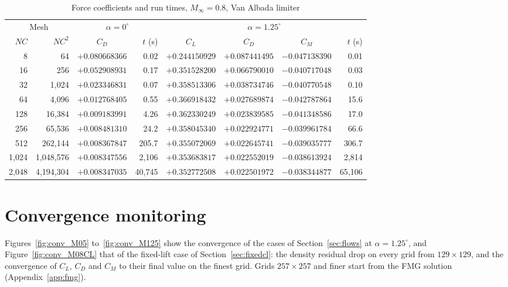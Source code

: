 \documentclass[12pt,a4paper]{article}
\begin{document}
\begin{table}[H]
\centering
\caption{Force coefficients and run times, $M_\infty=0.8$, Van Albada limiter}
\label{tab:forces_M08VA}
\footnotesize
\setlength{\tabcolsep}{4pt}
\renewcommand{\arraystretch}{1.0}
\begin{tabular}{@{}rrcrcccr@{}}
\toprule
\multicolumn{2}{c}{Mesh} & \multicolumn{2}{c}{$\alpha=0^\circ$} & \multicolumn{4}{c}{$\alpha=1.25^\circ$} \\
\cmidrule(lr){1-2}\cmidrule(lr){3-4}\cmidrule(l){5-8}
$NC$ & $NC^2$ & $C_D$ & $t$ (s) & $C_L$ & $C_D$ & $C_M$ & $t$ (s) \\
\midrule
8 & 64 & $+0.080668366$ & 0.02 & $+0.244150929$ & $+0.087441495$ & $-0.047138390$ & 0.01 \\
16 & 256 & $+0.052908931$ & 0.17 & $+0.351528200$ & $+0.066790010$ & $-0.040717048$ & 0.03 \\
32 & 1{,}024 & $+0.023346831$ & 0.07 & $+0.358513306$ & $+0.038734746$ & $-0.040770548$ & 0.10 \\
64 & 4{,}096 & $+0.012768405$ & 0.55 & $+0.366918432$ & $+0.027689874$ & $-0.042787864$ & 15.6 \\
128 & 16{,}384 & $+0.009183991$ & 4.26 & $+0.362330249$ & $+0.023839585$ & $-0.041348586$ & 17.0 \\
256 & 65{,}536 & $+0.008481310$ & 24.2 & $+0.358045340$ & $+0.022924771$ & $-0.039961784$ & 66.6 \\
512 & 262{,}144 & $+0.008367847$ & 205.7 & $+0.355072069$ & $+0.022645741$ & $-0.039035777$ & 306.7 \\
1{,}024 & 1{,}048{,}576 & $+0.008347556$ & 2{,}106 & $+0.353683817$ & $+0.022552019$ & $-0.038613924$ & 2{,}814 \\
2{,}048 & 4{,}194{,}304 & $+0.008347035$ & 40{,}745 & $+0.352772508$ & $+0.022501972$ & $-0.038344877$ & 65{,}106 \\
\bottomrule
\end{tabular}
\end{table}

\clearpage
\section{Convergence monitoring}\label{app:conv}

Figures~\ref{fig:conv_M05} to~\ref{fig:conv_M125} show the convergence of the cases of
Section~\ref{sec:flows} at $\alpha=1.25^\circ$, and Figure~\ref{fig:conv_M08CL} that of the fixed-lift
case of Section~\ref{sec:fixedcl}: the density residual drop on every grid from $129\times129$, and
the convergence of $C_L$, $C_D$ and $C_M$ to their final value on the finest grid. Grids
$257\times257$ and finer start from the FMG solution (Appendix~\ref{app:fmg}).
\end{document}
